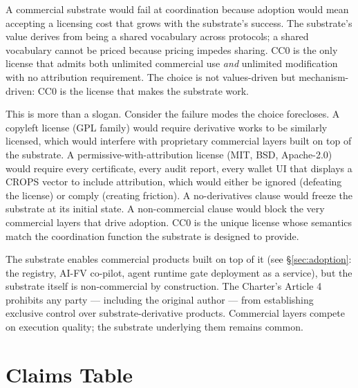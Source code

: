 \documentclass[11pt,a4paper]{article}
\begin{document}
A commercial substrate would fail at coordination because adoption would mean accepting a licensing cost that grows with the substrate's success. The substrate's value derives from being a shared vocabulary across protocols; a shared vocabulary cannot be priced because pricing impedes sharing. CC0 is the only license that admits both unlimited commercial use \emph{and} unlimited modification with no attribution requirement. The choice is not values-driven but mechanism-driven: CC0 is the license that makes the substrate work.

This is more than a slogan. Consider the failure modes the choice forecloses. A copyleft license (GPL family) would require derivative works to be similarly licensed, which would interfere with proprietary commercial layers built on top of the substrate. A permissive-with-attribution license (MIT, BSD, Apache-2.0) would require every certificate, every audit report, every wallet UI that displays a CROPS vector to include attribution, which would either be ignored (defeating the license) or comply (creating friction). A no-derivatives clause would freeze the substrate at its initial state. A non-commercial clause would block the very commercial layers that drive adoption. CC0 is the unique license whose semantics match the coordination function the substrate is designed to provide.

The substrate enables commercial products built on top of it (see \S\ref{sec:adoption}: the registry, AI-FV co-pilot, agent runtime gate deployment as a service), but the substrate itself is non-commercial by construction. The Charter's Article 4 prohibits any party --- including the original author --- from establishing exclusive control over substrate-derivative products. Commercial layers compete on execution quality; the substrate underlying them remains common.

\section{Claims Table}\label{sec:claims}
\end{document}
